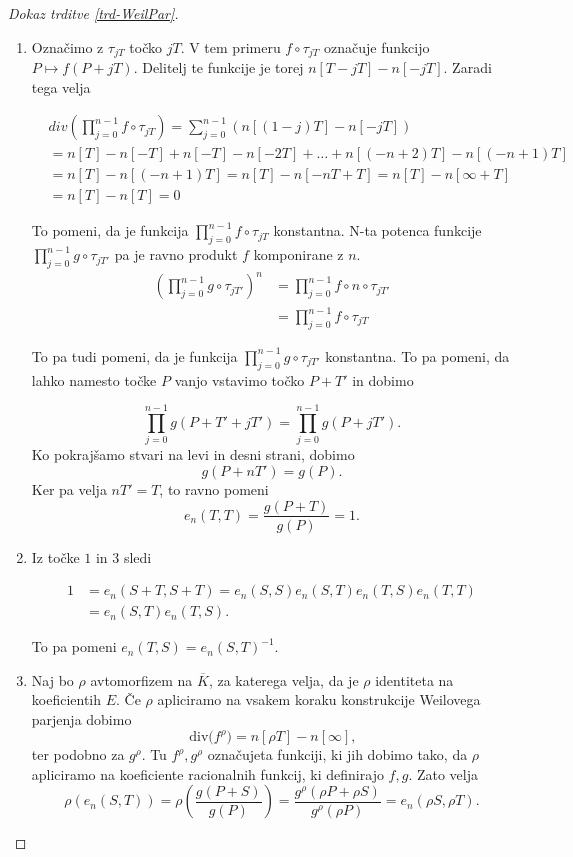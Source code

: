 \documentclass[12pt,a4paper,twoside]{article}
\theoremstyle{definition} %
\theoremstyle{plain} %
\numberwithin{equation}{section}  %
\newcommand{\Div}[1]{\ \text{div(}{#1}\text{)}}
\begin{document}
\begin{proof}[Dokaz trditve \ref{trd-WeilPar}]
\begin{enumerate}
\item Označimo z $\tau_{jT}$ točko $jT$. V tem primeru $f \circ \tau_{jT}$ označuje funkcijo \newline $P \mapsto f(P+jT)$. Delitelj te funkcije je torej $n[T-jT]-n[-jT]$. Zaradi tega velja

\begin{align}
&{}div(\prod_{j=0}^{n-1}f\circ \tau_{jT}) = \sum_{j=0}^{n-1}(n[(1-j)T]-n[-jT]) \nonumber \\
&{} = n[T] - n[-T] + n[-T] - n[-2T]+ \dots + n[(-n+2)T]-n[(-n+1)T]  \nonumber \\
&{} = n[T]-n[(-n+1)T] = n[T]-n[-nT+T] = n[T] - n[\infty +T] \nonumber \\
&{} = n[T]-n[T] = 0 \nonumber
\end{align}

To pomeni, da je funkcija $\prod_{j=0}^{n-1}f\circ \tau_{jT}$ konstantna. N-ta potenca funkcije $\prod_{j=0}^{n-1}g\circ \tau_{jT'}$ pa je ravno produkt $f$ komponirane z $n$. 
\begin{align}
(\prod_{j=0}^{n-1}g\circ \tau_{jT'})^n &{}= \prod_{j=0}^{n-1}f \circ n \circ \tau_{jT'} \nonumber \\
&{}= \prod_{j=0}^{n-1}f \circ \tau_{jT}  \nonumber %
\end{align}

To pa tudi pomeni, da je funkcija $\prod_{j=0}^{n-1}g\circ \tau_{jT'}$ konstantna.
To pa pomeni, da lahko namesto točke $P$ vanjo vstavimo točko $P+T'$ in dobimo

$$\prod_{j=0}^{n-1}g( P + T'+jT') = \prod_{j=0}^{n-1}g(P+jT') .$$
Ko pokrajšamo stvari na levi in desni strani, dobimo
$$g(P+nT') = g(P).$$
Ker pa velja $nT' = T$, to ravno pomeni
$$e_n(T,T) = \frac{g(P+T)}{g(P)} = 1.$$


\item Iz točke $1$ in $3$ sledi

\begin{align}
1 &{}= e_n(S+T,S+T) = e_n(S,S)e_n(S,T)e_n(T,S)e_n(T,T) \nonumber \\
 &{} = e_n(S,T)e_n(T,S). \nonumber
\end{align}

To pa pomeni $e_n(T,S) = e_n(S,T)^{-1}$.

\item Naj bo $\rho$ avtomorfizem na $\overline{K}$, za katerega velja, da je $\rho$ identiteta na koeficientih $E$. Če $\rho$ apliciramo na vsakem koraku konstrukcije Weilovega parjenja dobimo
$$\Div{f^{\rho}} = n[\rho T] - n[\infty],$$
ter podobno za $g^{\rho}$. Tu $f^{\rho},g^{\rho}$ označujeta funkciji, ki jih dobimo tako, da $\rho$ apliciramo na koeficiente racionalnih funkcij, ki definirajo $f,g$.
Zato velja
$$\rho(e_n(S,T)) = \rho \left( \frac{g(P+S)}{g(P)} \right) = \frac{g^{\rho}(\rho P+\rho S)}{g^{\rho}(\rho P)} = e_n(\rho S,\rho T).$$


\end{enumerate}
\end{proof}
\end{document}
